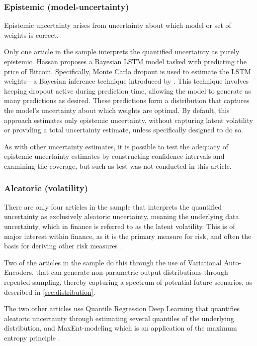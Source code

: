 \subsubsection{Epistemic (model-uncertainty)}
Epistemic uncertainty arises from uncertainty about which model or set of weights is correct.

Only one article in the sample \parencite{Hassan2024Bitcoin} interprets the quantified uncertainty as purely epistemic. Hassan proposes a Bayesian LSTM model tasked with predicting the price of Bitcoin. Specifically, Monte Carlo dropout is used to estimate the LSTM weights—a Bayesian inference technique introduced by \textcite{gal_ghahramani_2015}. This technique involves keeping dropout active during prediction time, allowing the model to generate as many predictions as desired. These predictions form a distribution that captures the model's uncertainty about which weights are optimal. By default, this approach estimates only epistemic uncertainty, without capturing latent volatility or providing a total uncertainty estimate, unless specifically designed to do so.

As with other uncertainty estimates, it is possible to test the adequacy of epistemic uncertainty estimates by constructing confidence intervals and examining the coverage, but such as test was not conducted in this article.


\subsubsection{Aleatoric (volatility)}
There are only four articles in the sample that interprets the quantified uncertainty as exclusively aleatoric uncertainty, meaning the underlying data uncertainty, which in finance is referred to as the latent volatility. This is of major interest within finance, as it is the primary measure for risk, and often the basis for deriving other risk measures \parencite{Brooks2003VolatilityFF}.

Two of the articles in the sample \parencite{arian2022encoded, xing2019sentiment} do this through the use of Variational Auto-Encoders, that can generate non-parametric output distributions through repeated sampling, thereby capturing a spectrum of potential future scenarios, as described in \ref{sec:distribution}.

The two other articles use Quantile Regression Deep Learning \parencite{Wang2024GoldForecasting} that quantifies aleatoric uncertainty through estimating several quantiles of the underlying distribution, and MaxEnt-modeling which is an application of the maximum entropy principle \parencite{Horenko2020}.

